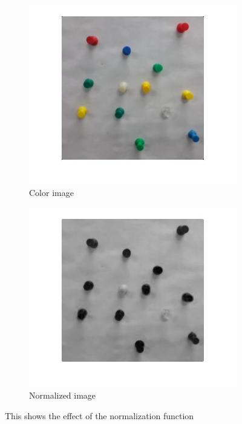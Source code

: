 \documentclass[12pt]{article}
\begin{document}
\begin{figure}
    \begin{subfigure}{.5\textwidth}
        \centering
        \includegraphics[width=\linewidth]{pins_filt}
        \caption{Color image}
    \end{subfigure}\hfill
    \begin{subfigure}{.5\textwidth}
        \centering
        \includegraphics[width=\linewidth]{pins_norm}
        \caption{Normalized image}
    \end{subfigure}
    \caption{This shows the effect of the normalization function}
    \label{fig_norm}
\end{figure}
\end{document}
